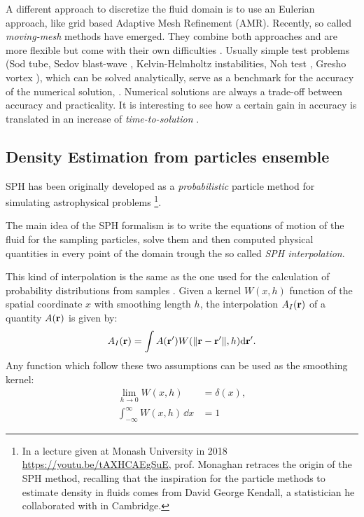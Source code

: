 A different approach to discretize the fluid domain is to use an Eulerian approach, like grid based Adaptive Mesh Refinement (AMR).
Recently, so called \emph{moving-mesh} methods have emerged. They combine both approaches and are more flexible but come with their own difficulties \citep{Springel2010, Shadowfax, Arepo}.
Usually simple test problems (Sod tube, Sedov blast-wave \citep{Sedov1946}, Kelvin-Helmholtz instabilities, Noh test \citep{Noh1987}, Gresho vortex \citep{Gresho1990}),
which can be solved analytically, serve as a benchmark for the accuracy of the numerical solution, \citep[e.g. by measuring the distance of the two solution with an L2-norm in the whole domain, ][]{BorrowSphenix}.
Numerical solutions are always a trade-off between accuracy and practicality.
It is interesting to see how a certain gain in accuracy is translated in an increase of \emph{time-to-solution} \citep{Borrow2019}.

\subsection{Density Estimation from particles ensemble}\label{sec:density_estimation}
SPH has been originally developed as a \emph{probabilistic} particle method for simulating astrophysical problems \citep{Lucy1977, Gingold1977, Monaghan2005}\footnote{In a lecture given at Monash University in 2018 \url{https://youtu.be/tAXHCAEgSuE}, prof. Monaghan retraces the origin of the SPH method, recalling that the inspiration for the particle methods to estimate density in fluids comes from David George Kendall, a statistician he collaborated with in Cambridge.}.

The main idea of the SPH formalism is to write the equations of motion of the fluid for the sampling particles, solve them and then computed physical quantities in every point of the domain trough the so called \emph{SPH interpolation}.

This kind of interpolation is the same as the one used for the calculation of probability distributions from samples \citep{parzen1962estimation, 5178637}.
Given a kernel $W(x, h)$ function of the spatial coordinate $x$ with smoothing length $h$, the interpolation $A_I(\boldsymbol{\mathbf{r}})$ of a quantity $A(\boldsymbol{\mathbf{r}})$ is given by:
\begin{equation}
  A_I(\boldsymbol{\mathbf{r}}) = \int A(\boldsymbol{\mathbf{r}}') W(\norm{\boldsymbol{\mathbf{r}} - \boldsymbol{\mathbf{r}}'},h) \dd\boldsymbol{\mathbf{r}}'.
  \label{eq:sph_interpolation}
\end{equation}
Any function which follow these two assumptions can be used as the smoothing kernel:
\begin{align*}
  \lim_{h\rightarrow 0} W(x, h) &= \delta(x),\\
  \int_{-\infty}^\infty W(x, h)\, \dd x &= 1
\end{align*}

